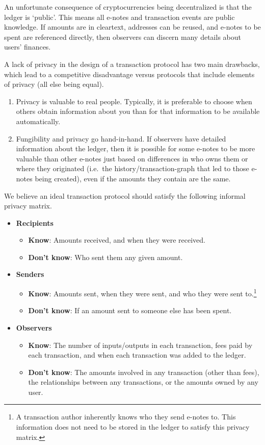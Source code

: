 An unfortunate consequence of cryptocurrencies being decentralized is that the ledger is `public'. This means all e-notes and transaction events are public knowledge. If amounts are in cleartext, addresses can be reused, and e-notes to be spent are referenced directly, then observers can discern many details about users' finances.

A lack of privacy in the design of a transaction protocol has two main drawbacks, which lead to a competitive disadvantage versus protocols that include elements of privacy (all else being equal).

\begin{enumerate}
    \item Privacy is valuable to real people. Typically, it is preferable to choose when others obtain information about you than for that information to be available automatically.
    \item Fungibility and privacy go hand-in-hand. If observers have detailed information about the ledger, then it is possible for some e-notes to be more valuable than other e-notes just based on differences in who owns them or where they originated (i.e.\ the history/transaction-graph that led to those e-notes being created), even if the amounts they contain are the same.
\end{enumerate}

We believe an ideal transaction protocol should satisfy the following informal privacy matrix.

\begin{itemize}
    \item \textbf{Recipients}
    \begin{itemize}
        \item \textbf{Know}: Amounts received, and when they were received.
        \item \textbf{Don't know}: Who sent them any given amount.
    \end{itemize}
    \item \textbf{Senders}
    \begin{itemize}
        \item \textbf{Know}: Amounts sent, when they were sent, and who they were sent to.\footnote{A transaction author inherently knows who they send e-notes to. This information does not need to be stored in the ledger to satisfy this privacy matrix.}
        \item \textbf{Don't know}: If an amount sent to someone else has been spent.
    \end{itemize}
    \item \textbf{Observers}
    \begin{itemize}
        \item \textbf{Know}: The number of inputs/outputs in each transaction, fees paid by each transaction, and when each transaction was added to the ledger.
        \item \textbf{Don't know}: The amounts involved in any transaction (other than fees), the relationships between any transactions, or the amounts owned by any user.
    \end{itemize}
\end{itemize}

